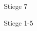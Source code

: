 \documentclass[a4paper]{article}
\begin{document}
\printGenericVSLHeader

\begin{center}
\begin{vsltext}{3cm}{3.5cm}

    \Stair{2cm} Stiege 7

    \vspace{3cm}

    \Stair{2cm} Stiege 1-5

\end{vsltext}
\end{center}
\end{document}
